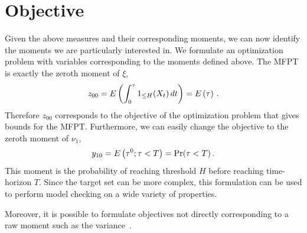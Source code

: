 \section{Objective}
Given the above measures and their corresponding moments, we can
now identify the moments we are particularly interested in.
We formulate an optimization problem with variables corresponding 
to the moments defined above.
The \ac{MFPT} is exactly the zeroth moment of $\xi$,
\[
	z_{00}={E}\left(\int_0^{\tau}1_{\leq H}(X_t)\,dt\right) = {E}\left(\tau\right)\,.
\]
Therefore $z_{00}$ corresponds to the objective of the optimization problem
that gives bounds for the \ac{MFPT}.
Furthermore, we can easily change the objective to the  
zeroth moment of $\nu_1$,
\[
	y_{10} = {E}\left(\tau^0;\tau<T\right)=\Pr(\tau < T)\,.
\]
This moment is the probability of reaching
threshold $H$ before reaching time-horizon $T$. Since the target set can be more complex, this formulation can be used to perform model checking on a
wide variety of properties.

Moreover, it is possible to formulate objectives not directly corresponding to
a raw moment such as the variance~\parencite{sakurai2019bounding,dowdy2018bounds}.

